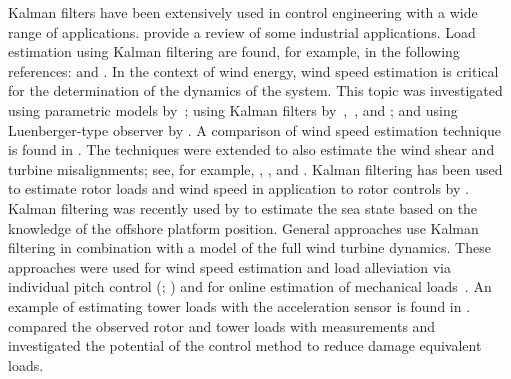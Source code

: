 \documentclass[wes, manuscript]{copernicus}
\begin{document}

Kalman filters have been extensively used in control engineering with a wide range of applications. 
\cite{auger:2013} provide a review of some industrial applications. Load estimation using Kalman filtering are found, for example, in the following references: \cite{ma:2004} and \cite{azam:2015}.
In the context of wind energy, wind speed estimation is critical for the determination of the dynamics of the system.
This topic was investigated using parametric models by~\cite{gocmen:2014}; using Kalman filters by~\cite{ostergaard:2007},~\cite{knudsen:2011}, and \cite{song:2017}; and using Luenberger-type observer by \cite{hafidi:2012}.
A comparison of wind speed estimation technique is found in \cite{soltani:2013}.
The techniques were extended to also estimate the wind shear and turbine misalignments; see, for example, \cite{bottasso:2010}, \cite{Simley:2016}, and \cite{Bertele:2018}.
Kalman filtering has been used to estimate rotor loads and wind speed in application to rotor controls by \cite{boukhezzar:2011}. 
Kalman filtering was recently used by \cite{Belloli:2019} to estimate the sea state based on the knowledge of the offshore platform position.
General approaches use Kalman filtering in combination with a model of the full wind turbine dynamics.  
These approaches were used for wind speed estimation and load alleviation via individual pitch control (\citealt{selvam:2009}; \citealt{bottasso:2009}) and for online estimation of mechanical loads~\citep{bossanyi:2003}.
An example of estimating tower loads with the acceleration sensor is found in \cite{Hau:2008}.
\cite{bossanyi:2012} compared the observed rotor and tower loads with measurements and investigated the potential of the control method to reduce damage equivalent loads.
\end{document}
